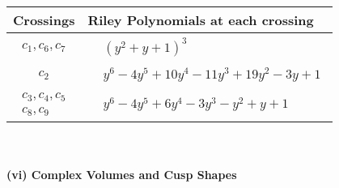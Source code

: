 \documentclass[1p]{elsarticle_modified}
\theoremstyle{definition}
\begin{document}
\begin{tabular}{m{50pt}|m{274pt}}
Crossings & \hspace{64pt}Riley Polynomials at each crossing \\
\hline $$\begin{aligned}c_{1},c_{6},c_{7}\end{aligned}$$&$\begin{aligned}
&(y^2+y+1)^3
\end{aligned}$\\
\hline $$\begin{aligned}c_{2}\end{aligned}$$&$\begin{aligned}
&y^6-4 y^5+10 y^4-11 y^3+19 y^2-3 y+1
\end{aligned}$\\
\hline $$\begin{aligned}c_{3},c_{4},c_{5}\\c_{8},c_{9}\end{aligned}$$&$\begin{aligned}
&y^6-4 y^5+6 y^4-3 y^3- y^2+y+1
\end{aligned}$\\
\hline
\end{tabular}\\~\\
\newpage\flushleft \textbf{(vi) Complex Volumes and Cusp Shapes}
\end{document}
